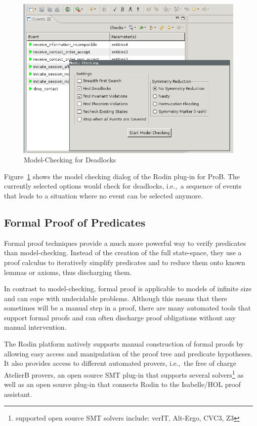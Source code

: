\documentclass{article}
\begin{document}
\begin{figure}[ht]
  \centering
  \includegraphics[width=.5\textwidth]{pictures/ProBModelChecking.png}
  \caption{Model-Checking for Deadlocks}
  \label{fig:Prob-model-check}
\end{figure}

Figure~\ref{fig:Prob-model-check} shows the model checking dialog of the Rodin
plug-in for ProB. The currently selected options would check for deadlocks,
i.e.,\ a sequence of events that leads to a situation where no event can be
selected anymore.


\subsection{Formal Proof of Predicates}
\label{sec:form-proof-pred}

Formal proof techniques provide a much more powerful way to verify predicates
than model-checking. Instead of the creation of the full state-space, they use a
proof calculus to iteratively simplify predicates and to reduce them onto known
lemmas or axioms, thus discharging them.

In contrast to model-checking, formal proof is applicable to models of infinite
size and can cope with undecidable problems. Although this means that there
sometimes will be a manual step in a proof, there are many automated tools that
support formal proofs and can often discharge proof obligations without any
manual intervention.

The Rodin platform natively supports manual construction of formal proofs by
allowing easy access and manipulation of the proof tree and predicate
hypotheses. It also provides access to different automated provers, i.e.,\ the
free of charge AtelierB provers, an open source SMT plug-in that supports
several solvers\footnote{supported open source SMT solvers include: verIT,
  Alt-Ergo, CVC3, Z3} as well as an open source plug-in that connects Rodin to
the Isabelle/HOL proof assistant.
\end{document}
